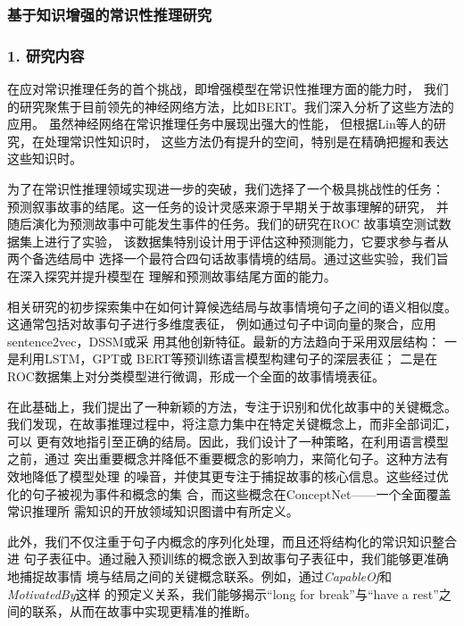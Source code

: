 \subsubsection{基于知识增强的常识性推理研究}

\subsubsection*{1. 研究内容}
在应对常识推理任务的首个挑战，即增强模型在常识性推理方面的能力时，
我们的研究聚焦于目前领先的神经网络方法，比如BERT。我们深入分析了这些方法的应用。
虽然神经网络在常识推理任务中展现出强大的性能，
但根据Lin等人的研究\cite{lin2020birds,peng2022copen}，在处理常识性知识时，
这些方法仍有提升的空间，特别是在精确把握和表达这些知识时。

为了在常识性推理领域实现进一步的突破，我们选择了一个极具挑战性的任务：
预测叙事故事的结尾。这一任务的设计灵感来源于早期关于故事理解的研究\cite{meehan1977tale}，
并随后演化为预测故事中可能发生事件的任务\cite{chambers2008unsupervised}。我们的研究在ROC
故事填空测试数据集\cite{mostafazadeh2016corpus}上进行了实验，
该数据集特别设计用于评估这种预测能力，它要求参与者从两个备选结局中
选择一个最符合四句话故事情境的结局。通过这些实验，我们旨在深入探究并提升模型在
理解和预测故事结尾方面的能力。

相关研究的初步探索集中在如何计算候选结局与故事情境句子之间的语义相似度。
这通常包括对故事句子进行多维度表征，
例如通过句子中词向量的聚合\cite{mikolov2013distributed}，应用
sentence2vec\cite{kiros2015skip}，DSSM\cite{huang2013learning}或采
用其他创新特征\cite{schwartz2017story}。最新的方法趋向于采用双层结构：
一是利用LSTM\cite{hochreiter1997long}，GPT\cite{radford2018improving}或
BERT\cite{devlin2018bert}等预训练语言模型构建句子的深层表征；
二是在ROC数据集上对分类模型进行微调，形成一个全面的故事情境表征。

在此基础上，我们提出了一种新颖的方法，专注于识别和优化故事中的关键概念。
我们发现，在故事推理过程中，将注意力集中在特定关键概念上，而非全部词汇，可以
更有效地指引至正确的结局。因此，我们设计了一种策略，在利用语言模型之前，通过
突出重要概念并降低不重要概念的影响力，来简化句子。这种方法有效地降低了模型处理
的噪音，并使其更专注于捕捉故事的核心信息。这些经过优化的句子被视为事件和概念的集
合，而这些概念在ConceptNet\cite{speer2017conceptnet}——一个全面覆盖常识推理所
需知识的开放领域知识图谱中有所定义。

此外，我们不仅注重于句子内概念的序列化处理，而且还将结构化的常识知识整合进
句子表征中。通过融入预训练的概念嵌入到故事句子表征中，我们能够更准确地捕捉故事情
境与结局之间的关键概念联系。例如，通过\textit{CapableOf}和\textit{MotivatedBy}这样
的预定义关系，我们能够揭示``long for break''与``have a rest''之间的联系，从而在故事中实现更精准的推断。

